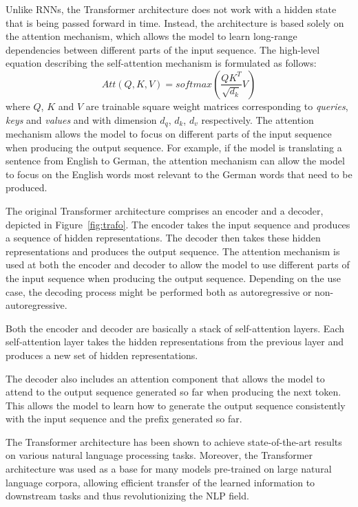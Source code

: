 Unlike RNNs, the Transformer architecture does not work with a hidden state that is being passed forward in time.
Instead, the architecture is based solely on the attention mechanism, which allows the model to learn long-range dependencies between different parts of the input sequence.
The high-level equation describing the self-attention mechanism is formulated as follows:
\begin{equation*}
    Att(Q,K,V) = softmax(\frac{QK^T}{\sqrt{d_k}}V)
\end{equation*}
where $Q$, $K$ and $V$ are trainable square weight matrices corresponding to \emph{queries}, \emph{keys} and \emph{values} and with dimension $d_q$, $d_k$, $d_v$ respectively.
The attention mechanism allows the model to focus on different parts of the input sequence when producing the output sequence.
For example, if the model is translating a sentence from English to German, the attention mechanism can allow the model to focus on the English words most relevant to the German words that need to be produced.

The original Transformer architecture comprises an encoder and a decoder, depicted in Figure~\ref{fig:trafo}.
The encoder takes the input sequence and produces a sequence of hidden representations.
The decoder then takes these hidden representations and produces the output sequence.
The attention mechanism is used at both the encoder and decoder to allow the model to use different parts of the input sequence when producing the output sequence.
Depending on the use case, the decoding process might be performed both as autoregressive or non-autoregressive.

Both the encoder and decoder are basically a stack of self-attention layers.
Each self-attention layer takes the hidden representations from the previous layer and produces a new set of hidden representations.

The decoder also includes an attention component that allows the model to attend to the output sequence generated so far when producing the next token.
This allows the model to learn how to generate the output sequence consistently with the input sequence and the prefix generated so far.

The Transformer architecture has been shown to achieve state-of-the-art results on various natural language processing tasks. 
Moreover, the Transformer architecture was used as a base for many models pre-trained on large natural language corpora, allowing efficient transfer of the learned information to downstream tasks and thus revolutionizing the NLP field.

